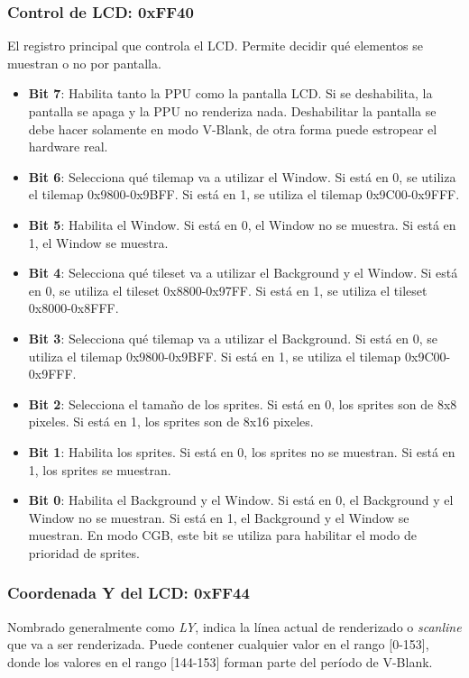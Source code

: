\subsubsection{Control de LCD: 0xFF40} \label{lcd_control}

El registro principal que controla el LCD. Permite decidir qué elementos se muestran o no por pantalla.

\begin{itemize}
    \item \textbf{Bit 7}: Habilita tanto la PPU como la pantalla LCD. Si se deshabilita, la pantalla se apaga y la PPU no renderiza nada. Deshabilitar la pantalla se debe hacer solamente en modo V-Blank, de otra forma puede estropear el hardware real.
    \item \textbf{Bit 6}: Selecciona qué tilemap va a utilizar el Window. Si está en 0, se utiliza el tilemap 0x9800-0x9BFF. Si está en 1, se utiliza el tilemap 0x9C00-0x9FFF.
    \item \textbf{Bit 5}: Habilita el Window. Si está en 0, el Window no se muestra. Si está en 1, el Window se muestra.
    \item \textbf{Bit 4}: Selecciona qué tileset va a utilizar el Background y el Window. Si está en 0, se utiliza el tileset 0x8800-0x97FF. Si está en 1, se utiliza el tileset 0x8000-0x8FFF.
    \item \textbf{Bit 3}: Selecciona qué tilemap va a utilizar el Background. Si está en 0, se utiliza el tilemap 0x9800-0x9BFF. Si está en 1, se utiliza el tilemap 0x9C00-0x9FFF.
    \item \textbf{Bit 2}: Selecciona el tamaño de los sprites. Si está en 0, los sprites son de 8x8 pixeles. Si está en 1, los sprites son de 8x16 pixeles.
    \item \textbf{Bit 1}: Habilita los sprites. Si está en 0, los sprites no se muestran. Si está en 1, los sprites se muestran.
    \item \textbf{Bit 0}: Habilita el Background y el Window. Si está en 0, el Background y el Window no se muestran. Si está en 1, el Background y el Window se muestran. En modo CGB, este bit se utiliza para habilitar el modo de prioridad de sprites.
\end{itemize}

\subsubsection{Coordenada Y del LCD: 0xFF44}
Nombrado generalmente como \textit{LY}, indica la línea actual de renderizado o \textit{scanline} que va a ser renderizada. Puede contener cualquier valor en el rango [0-153], donde los valores en el rango [144-153] forman parte del período de V-Blank.

